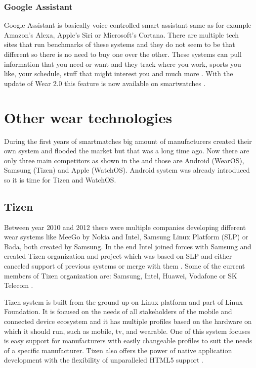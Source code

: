 \subsubsection{Google Assistant}\label{sec:GoogleAssistant}
Google Assistant is basically voice controlled smart assistant same as for example Amazon's Alexa, Apple's Siri or Microsoft's Cortana. There are multiple tech sites that run benchmarks of these systems \cite{ASGA, VACCGASAB, CAGACS, GASBAC} and they do not seem to be that different so there is no need to buy one over the other. These systems can pull information that you need or want and they track where you work, sports you like, your schedule, stuff that might interest you and much more \cite{WIGA}. With the update of Wear 2.0 this feature is now available on smartwatches \cite{AW2UG, AW2WN}.

\section{Other wear technologies}\label{sec:OtherWearTechnologies}
During the first years of smartmatches big amount of manufacturers created their own system and flooded the market but that was a long time ago. Now there are only three main competitors as shown in the  and those are Android (WearOS), Samsung (Tizen) and Apple (WatchOS). Android system was already introduced so it is time for Tizen and WatchOS.

\subsection{Tizen}\label{sec:Tizen}
Between year 2010 and 2012 there were multiple companies developing different wear systems like MeeGo by Nokia and Intel, Samsung Linux Platform (SLP) or Bada, both created by Samsung. In the end Intel joined forces with Samsung and created Tizen organization and project which was based on SLP and either canceled support of previous systems or merge with them \cite{TOSBHR}. Some of the current members of Tizen organization are: Samsung, Intel, Huawei, Vodafone or SK Telecom \cite{TizenM}.

Tizen system is built from the ground up on Linux platform and part of Linux Foundation. It is focused on the needs of all stakeholders of the mobile and connected device ecosystem and it has multiple profiles based on the hardware on which it should run, such as mobile, tv, and wearable. One of this system focuses is easy support for manufacturers with easily changeable profiles to suit the needs of a specific manufacturer. Tizen also offers the power of native application development with the flexibility of unparalleled HTML5 support \cite{TizenAbout}.

